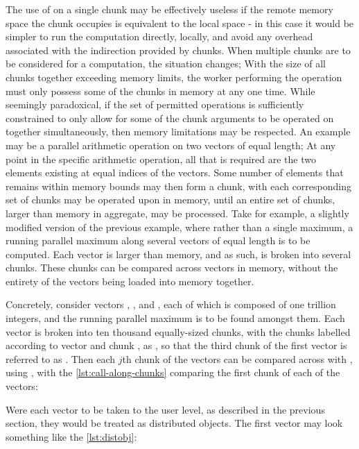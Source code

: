 The use of  on a single chunk may be effectively useless if the remote memory space the chunk occupies is equivalent to the local space - in this case it would be simpler to run the computation directly, locally, and avoid any overhead associated with the indirection provided by chunks.
When multiple chunks are to be considered for a computation, the situation changes; With the size of all chunks together exceeding memory limits, the worker performing the operation must only possess some of the chunks in memory at any one time.
While seemingly paradoxical, if the set of permitted operations is sufficiently constrained to only allow for some of the chunk arguments to be operated on together simultaneously, then memory limitations may be respected.
An example may be a parallel arithmetic operation on two vectors of equal length; At any point in the specific arithmetic operation, all that is required are the two elements existing at equal indices of the vectors.
Some number of elements that remains within memory bounds may then form a chunk, with each corresponding set of chunks may be operated upon in memory, until an entire set of chunks, larger than memory in aggregate, may be processed.
Take for example, a slightly modified version of the previous example, where rather than a single maximum, a running parallel maximum along several vectors of equal length is to be computed.
Each vector is larger than memory, and as such, is broken into several chunks.
These chunks can be compared across vectors in memory, without the entirety of the vectors being loaded into memory together.

Concretely, consider vectors , , and , each of which is composed of one trillion integers, and the running parallel maximum is to be found amongst them.
Each vector is broken into ten thousand equally-sized chunks, with the chunks labelled according to vector  and chunk , as , so that the third chunk of the first vector is referred to as .
Then each \(j\)th chunk of the vectors can be compared across with , using , with the \cref{lst:call-along-chunks} comparing the first chunk of each of the vectors:


Were each vector to be taken to the user level, as described in the previous section, they would be treated as distributed objects.
The first vector  may look something like the \cref{lst:distobj}:

